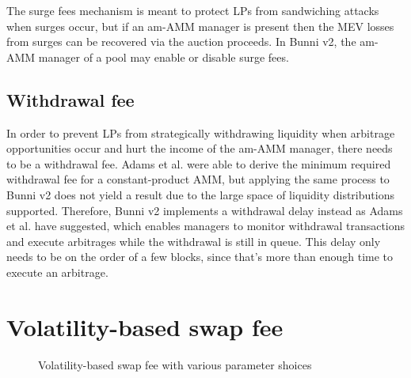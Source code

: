 \documentclass[twocolumn]{article}
\begin{document}
The surge fees mechanism is meant to protect LPs from sandwiching attacks when surges occur, but if an am-AMM manager is present then the MEV losses from surges can be recovered via the auction proceeds. In Bunni v2, the am-AMM manager of a pool may enable or disable surge fees.

\subsection{Withdrawal fee}

In order to prevent LPs from strategically withdrawing liquidity when arbitrage opportunities occur and hurt the income of the am-AMM manager, there needs to be a withdrawal fee. Adams et al. \cite{adams2024amamm} were able to derive the minimum required withdrawal fee for a constant-product AMM, but applying the same process to Bunni v2 does not yield a result due to the large space of liquidity distributions supported. Therefore, Bunni v2 implements a withdrawal delay instead as Adams et al. have suggested, which enables managers to monitor withdrawal transactions and execute arbitrages while the withdrawal is still in queue. This delay only needs to be on the order of a few blocks, since that's more than enough time to execute an arbitrage.

\section{Volatility-based swap fee}

\begin{figure}
  \centering
  \caption{Volatility-based swap fee with various parameter shoices}
  \label{fig:dynamic_fee_model}
\end{figure}
\end{document}
